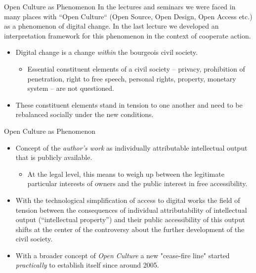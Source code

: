 \documentclass{beamer}
\title{Modelling Sustainable Systems\\ and Semantic Web\\[6pt] Open Culture
  \vskip1em}
\subtitle{Lecture in the Module 10-202-2309\\ for Master Computer Science}
\author{Prof. Dr. Hans-Gert Gräbe\\
\url{http://www.informatik.uni-leipzig.de/~graebe}}
\date{February 2022}
\begin{document}
{
\begin{frame}
  \titlepage
\end{frame}}

\begin{frame}{Open Culture as Phenomenon}  
In the lectures and seminars we were faced in many places with “Open Culture“
(Open Source, Open Design, Open Access etc.) as a phenomenon of digital
change. In the last lecture we developed an interpretation framework for this
phenomenon in the context of cooperate action.
\begin{itemize}
\item Digital change is a change \emph{within} the bourgeois civil society.
  \begin{itemize}
  \item Essential constituent elements of a civil society -- privacy,
    prohibition of penetration, right to free speech, personal rights,
    property, monetary system -- are not questioned.
  \end{itemize}
\item These constituent elements stand in tension to one another and need to
  be rebalanced socially under the new conditions.
\end{itemize}
\end{frame}

\begin{frame}{Open Culture as Phenomenon} 
\begin{itemize} 
\item Concept of the \emph{author's work} as individually attributable
  intellectual output that is publicly available. 
  \begin{itemize} 
  \item At the legal level, this means to weigh up between the legitimate
    particular interests of owners and the public interest in free
    accessibility.
  \end{itemize}
\item With the technological simplification of access to digital works the
  field of tension between the consequences of individual attributability of
  intellectual output (“intellectual property”) and their public accessibility
  of this output shifts at the center of the controversy about the further
  development of the civil society.
\item With a broader concept of \emph{Open Culture} a new "cease-fire line"
  started \emph{practically} to establish itself since around 2005.
\end{itemize}
\end{frame}
\end{document}
